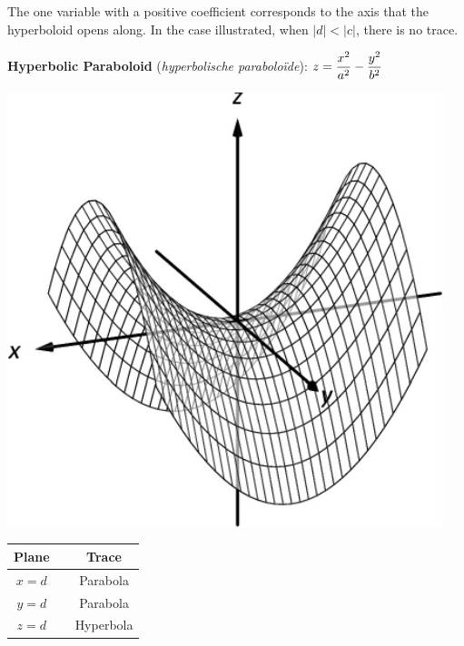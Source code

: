 The one variable with a positive coefficient corresponds to the axis that the hyperboloid opens along. In the case illustrated, when $|d|<|c|$, there is no trace.

\ifanalysis\pagebreak\fi
\textbf{Hyperbolic Paraboloid} (\textit{hyperbolische parabolo\"ide}): \quad$\displaystyle z=\frac{x^2}{a^2}-\frac{y^2}{b^2}$

\begin{minipage}[c]{.3\linewidth}
\vskip0pt
\includegraphics[width=0.95\textwidth]{fig_ana_geo_22a}
\end{minipage}
\begin{minipage}[c]{.45\linewidth}
\vskip0pt\hskip 10pt
\begin{tabular}[]{ccc}
\textbf{Plane}  & & \textbf{Trace} \\ \hline
$x=d$ & & Parabola\\
$y=d$ & & Parabola\\
$z=d$ & & Hyperbola
\end{tabular}
\end{minipage}%

